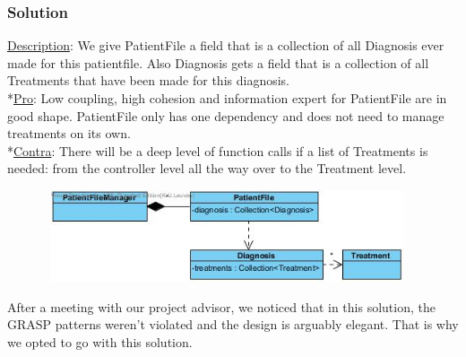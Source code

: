 \documentclass[11pt]{article}
\begin{document}
\subsubsection{Solution}
\underline{Description}: We give PatientFile a field that is a collection of all Diagnosis ever made for this patientfile. Also Diagnosis gets a field that is a collection of all Treatments that have been made for this diagnosis.
\\*\underline{Pro}: Low coupling, high cohesion and information expert for PatientFile are in good shape. PatientFile only has one dependency and does not need to manage treatments on its own.
\\*\underline{Contra}: There will be a deep level of function calls if a list of Treatments is needed: from the controller level all the way over to the Treatment level.
\begin{center}
\includegraphics[width=130mm, height=27mm]{patientfilediagwin.jpg}
\end{center}
After a meeting with our project advisor, we noticed that in this solution, the GRASP patterns weren’t violated and the design is arguably elegant. That is why we opted to go with this solution.
\end{document}
